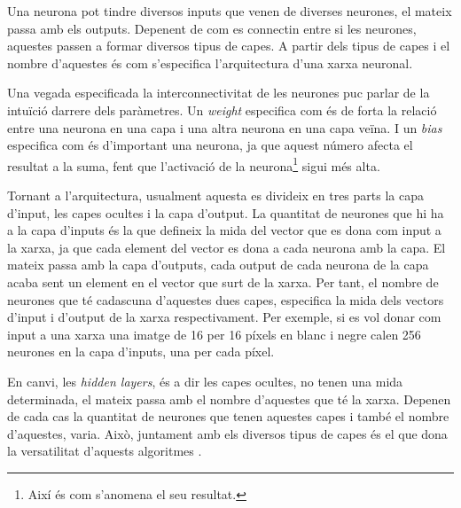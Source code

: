 Una neurona pot tindre diversos inputs que venen de diverses neurones, el mateix passa amb els outputs. Depenent de com es connectin entre si les neurones, aquestes passen a formar diversos tipus de capes. A partir dels tipus de capes i el nombre d'aquestes és com s'especifica l'arquitectura d'una xarxa neuronal.

Una vegada especificada la interconnectivitat de les neurones puc parlar de la intuïció darrere dels paràmetres. Un \textit{weight} especifica com és de forta la relació entre una neurona en una capa i una altra neurona en una capa veïna. I un \textit{bias} especifica com és d'important una neurona, ja que aquest número afecta el resultat a la suma, fent que l'activació de la neurona\footnote{Així és com s'anomena el seu resultat.} sigui més alta.

Tornant a l'arquitectura, usualment aquesta es divideix en tres parts la capa d'input, les capes ocultes i la capa d'output. La quantitat de neurones que hi ha a la capa d'inputs és la que defineix la mida del vector que es dona com input a la xarxa, ja que cada element del vector es dona a cada neurona amb la capa. El mateix passa amb la capa d'outputs, cada output de cada neurona de la capa acaba sent un element en el vector que surt de la xarxa. Per tant, el nombre de neurones que té cadascuna d'aquestes dues capes, especifica la mida dels vectors d'input i d'output de la xarxa respectivament. Per exemple, si es vol donar com input a una xarxa una imatge de 16 per 16 píxels en blanc i negre calen 256 neurones en la capa d'inputs, una per cada píxel.

En canvi, les \textit{hidden layers}, és a dir les capes ocultes, no tenen una mida determinada, el mateix passa amb el nombre d'aquestes que té la xarxa. Depenen de cada cas la quantitat de neurones que tenen aquestes capes i també el nombre d'aquestes, varia. Això, juntament amb els diversos tipus de capes és el que dona la versatilitat d'aquests algoritmes \cite{DL:feedforward}.


